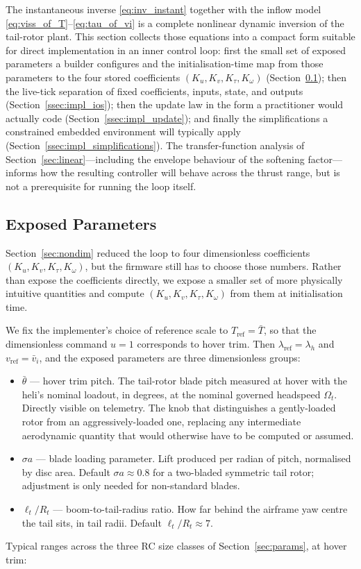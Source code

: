 \documentclass[11pt,a4paper]{article}
\newcommand{\OmegaT}{\Omega_t}
\newcommand{\Rt}{R_t}
\newcommand{\bvi}{\bar{v}_i}
\newcommand{\bT}{\bar{T}}
\newcommand{\btheta}{\bar{\theta}}
\begin{document}
The instantaneous inverse \eqref{eq:inv_instant} together with the
inflow model \eqref{eq:viss_of_T}--\eqref{eq:tau_of_vi} is a complete
nonlinear dynamic inversion of the tail-rotor plant. This section
collects those equations into a compact form suitable for direct
implementation in an inner control loop: first the small set of
exposed parameters a builder configures and the initialisation-time map from
those parameters to the four stored coefficients \((K_u,K_v,K_\tau,K_\omega)\)
(Section~\ref{ssec:impl_exposed}); then the live-tick separation of
fixed coefficients, inputs, state, and outputs
(Section~\ref{ssec:impl_ios}); then the update law in the form a
practitioner would actually code (Section~\ref{ssec:impl_update}); and
finally the simplifications a constrained embedded environment will
typically apply (Section~\ref{ssec:impl_simplifications}). The
transfer-function analysis of Section~\ref{sec:linear}---including the
envelope behaviour of the softening factor---informs how the resulting
controller will behave across the thrust range, but is not a
prerequisite for running the loop itself.

\subsection{Exposed Parameters}\label{ssec:impl_exposed}

Section~\ref{sec:nondim} reduced the loop to four dimensionless
coefficients \((K_u,K_v,K_\tau,K_\omega)\), but the firmware still has to choose those
numbers. Rather than expose the coefficients directly, we expose a
smaller set of more physically intuitive quantities and compute
\((K_u,K_v,K_\tau,K_\omega)\) from them at initialisation time.

We fix the implementer's choice of reference scale to
\(T_{\text{ref}} = \bT\), so that the dimensionless command \(u=1\)
corresponds to hover trim. Then \(\lambda_{\text{ref}} = \lambda_h\)
and \(v_{\text{ref}} = \bvi\), and the exposed parameters are three
dimensionless groups:
\begin{itemize}[leftmargin=*,itemsep=3pt,topsep=2pt]
\item \(\btheta\) --- hover trim pitch. The tail-rotor blade pitch
      measured at hover with the heli's nominal loadout, in degrees,
      at the nominal governed headspeed \(\OmegaT\). Directly visible
      on telemetry. The knob that
      distinguishes a gently-loaded rotor from an
      aggressively-loaded one, replacing any intermediate
      aerodynamic quantity that would otherwise have to be computed
      or assumed.
\item \(\sigma a\) --- blade loading parameter. Lift produced per
      radian of pitch, normalised by disc area. Default
      \(\sigma a \approx 0.8\) for a two-bladed symmetric tail rotor;
      adjustment is only needed for non-standard blades.
\item \(\ell_t/\Rt\) --- boom-to-tail-radius ratio. How far behind
      the airframe yaw centre the tail sits, in tail radii. Default
      \(\ell_t/\Rt \approx 7\).
\end{itemize}
Typical ranges across the three RC size classes of
Section~\ref{sec:params}, at hover trim:
\end{document}
